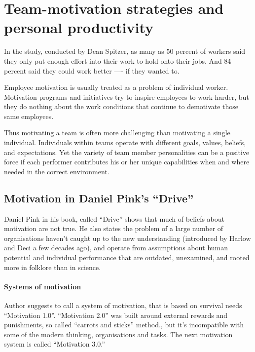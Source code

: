 \chapter{Team-motivation strategies and personal productivity}
\label{chap:strategies}

In the study, conducted by Dean Spitzer, as many as 50 percent of workers said they only put enough effort into their work to hold onto their jobs. And 84 percent said they could work better —- if they wanted to. \cite{spitzer}

Employee motivation is usually treated as a problem of individual worker. Motivation programs and initiatives try to inspire employees to work harder, but they do nothing about the work conditions that continue to demotivate those same employees.

Thus motivating a team is often more challenging than motivating a single individual. Individuals within teams operate with different goals, values, beliefs, and expectations. Yet the variety of team member personalities can be a positive force if each performer contributes his or her unique capabilities when and where needed \cite{clark-team-motivation} in the correct environment.

\section{Motivation in Daniel Pink's ``Drive''}

Daniel Pink in his book, called ``Drive'' shows that much of beliefs about motivation are not true. He also states the problem of a large number of organisations haven't caught up to the new understanding (introduced by Harlow and Deci a few decades ago), and operate from assumptions about human potential and individual performance that are outdated, unexamined, and rooted more in folklore than in science.

\subsubsection{Systems of motivation}

Author suggests to call a system of motivation, that is based on survival needs ``Motivation 1.0''. ``Motivation 2.0'' was built around external rewards and punishments, so called ``carrots and sticks'' method., but it's incompatible with some of the modern thinking, organisations and tasks. The next motivation system is called ``Motivation 3.0.''


